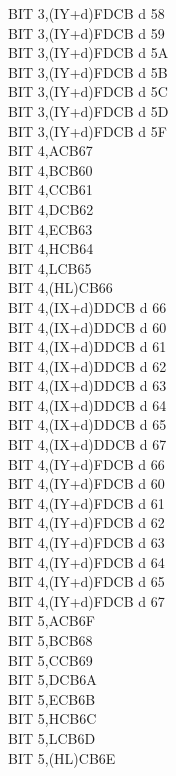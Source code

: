 \documentclass[12pt,twoside,openright,a4paper]{book}
\begin{document}
\begin{multicols}{3}
{\begin{tabbing}
		BIT 3,(IY+d)\UNDOC\>FDCB d 58\\
		BIT 3,(IY+d)\UNDOC\>FDCB d 59\\
		BIT 3,(IY+d)\UNDOC\>FDCB d 5A\\
		BIT 3,(IY+d)\UNDOC\>FDCB d 5B\\
		BIT 3,(IY+d)\UNDOC\>FDCB d 5C\\
		BIT 3,(IY+d)\UNDOC\>FDCB d 5D\\
		BIT 3,(IY+d)\UNDOC\>FDCB d 5F\\
		BIT 4,A\>CB67\\
		BIT 4,B\>CB60\\
		BIT 4,C\>CB61\\
		BIT 4,D\>CB62\\
		BIT 4,E\>CB63\\
		BIT 4,H\>CB64\\
		BIT 4,L\>CB65\\
		BIT 4,(HL)\>CB66\\
		BIT 4,(IX+d)\>DDCB d 66\\
		BIT 4,(IX+d)\UNDOC\>DDCB d 60\\
		BIT 4,(IX+d)\UNDOC\>DDCB d 61\\
		BIT 4,(IX+d)\UNDOC\>DDCB d 62\\
		BIT 4,(IX+d)\UNDOC\>DDCB d 63\\
		BIT 4,(IX+d)\UNDOC\>DDCB d 64\\
		BIT 4,(IX+d)\UNDOC\>DDCB d 65\\
		BIT 4,(IX+d)\UNDOC\>DDCB d 67\\
		BIT 4,(IY+d)\>FDCB d 66\\
		BIT 4,(IY+d)\UNDOC\>FDCB d 60\\
		BIT 4,(IY+d)\UNDOC\>FDCB d 61\\
		BIT 4,(IY+d)\UNDOC\>FDCB d 62\\
		BIT 4,(IY+d)\UNDOC\>FDCB d 63\\
		BIT 4,(IY+d)\UNDOC\>FDCB d 64\\
		BIT 4,(IY+d)\UNDOC\>FDCB d 65\\
		BIT 4,(IY+d)\UNDOC\>FDCB d 67\\
		BIT 5,A\>CB6F\\
		BIT 5,B\>CB68\\
		BIT 5,C\>CB69\\
		BIT 5,D\>CB6A\\
		BIT 5,E\>CB6B\\
		BIT 5,H\>CB6C\\
		BIT 5,L\>CB6D\\
		BIT 5,(HL)\>CB6E\\

\end{tabbing}}
\end{multicols}
\end{document}
